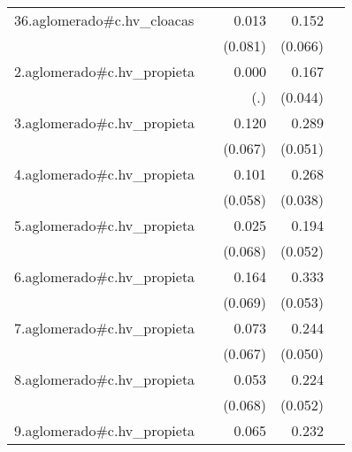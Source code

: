{\begin{longtable}{l*{4}{D{.}{.}{-1}}}
\addlinespace
36.aglomerado#c.hv\_cloacas&                     &       0.013         &       0.152\sym{*}  &                     \\
            &                     &     (0.081)         &     (0.066)         &                     \\
\addlinespace
2.aglomerado#c.hv\_propieta&                     &       0.000         &       0.167\sym{***}&                     \\
            &                     &         (.)         &     (0.044)         &                     \\
\addlinespace
3.aglomerado#c.hv\_propieta&                     &       0.120         &       0.289\sym{***}&                     \\
            &                     &     (0.067)         &     (0.051)         &                     \\
\addlinespace
4.aglomerado#c.hv\_propieta&                     &       0.101         &       0.268\sym{***}&                     \\
            &                     &     (0.058)         &     (0.038)         &                     \\
\addlinespace
5.aglomerado#c.hv\_propieta&                     &       0.025         &       0.194\sym{***}&                     \\
            &                     &     (0.068)         &     (0.052)         &                     \\
\addlinespace
6.aglomerado#c.hv\_propieta&                     &       0.164\sym{*}  &       0.333\sym{***}&                     \\
            &                     &     (0.069)         &     (0.053)         &                     \\
\addlinespace
7.aglomerado#c.hv\_propieta&                     &       0.073         &       0.244\sym{***}&                     \\
            &                     &     (0.067)         &     (0.050)         &                     \\
\addlinespace
8.aglomerado#c.hv\_propieta&                     &       0.053         &       0.224\sym{***}&                     \\
            &                     &     (0.068)         &     (0.052)         &                     \\
\addlinespace
9.aglomerado#c.hv\_propieta&                     &       0.065         &       0.232\sym{***}&                     \\

\end{longtable}}
